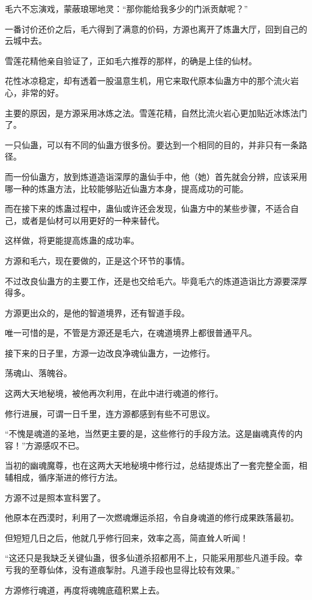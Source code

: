 \begin{this_body}
毛六不忘演戏，蒙蔽琅琊地灵：“那你能给我多少的门派贡献呢？”

一番讨价还价之后，毛六得到了满意的价码，方源也离开了炼蛊大厅，回到自己的云城中去。

雪莲花精他亲自验证了，正如毛六推荐的那样，的确是上佳的仙材。

花性冰凉稳定，却有透着一股温意生机，用它来取代原本仙蛊方中的那个流火岩心，非常的好。

主要的原因，是方源采用冰炼之法。雪莲花精，自然比流火岩心更加贴近冰炼法门了。

一只仙蛊，可以有不同的仙蛊方很多份。要达到一个相同的目的，并非只有一条路径。

而一份仙蛊方，放到炼道造诣深厚的蛊仙手中，他（她）首先就会分辨，应该采用哪一种的炼蛊方法，比较能够贴近仙蛊方本身，提高成功的可能。

而在接下来的炼蛊过程中，蛊仙或许还会发现，仙蛊方中的某些步骤，不适合自己，或者是仙材可以用更好的一种来替代。

这样做，将更能提高炼蛊的成功率。

方源和毛六，现在要做的，正是这个环节的事情。

不过改良仙蛊方的主要工作，还是也交给毛六。毕竟毛六的炼道造诣比方源要深厚得多。

方源更出众的，是他的智道境界，还有智道手段。

唯一可惜的是，不管是方源还是毛六，在魂道境界上都很普通平凡。

接下来的日子里，方源一边改良净魂仙蛊方，一边修行。

荡魂山、落魄谷。

这两大天地秘境，被他再次利用，在此中进行魂道的修行。

修行进展，可谓一日千里，连方源都感到有些不可思议。

“不愧是魂道的圣地，当然更主要的是，这些修行的手段方法。这是幽魂真传的内容！”方源感叹不已。

当初的幽魂魔尊，也在这两大天地秘境中修行过，总结提炼出了一套完整全面，相辅相成，循序渐进的修行方法。

方源不过是照本宣科罢了。

他原本在西漠时，利用了一次燃魂爆运杀招，令自身魂道的修行成果跌落最初。

但短短几日之后，他就几乎修行回来，效率之高，简直耸人听闻！

“这还只是我缺乏关键仙蛊，很多仙道杀招都用不上，只能采用那些凡道手段。幸亏我的至尊仙体，没有道痕掣肘。凡道手段也显得比较有效果。”

方源修行魂道，再度将魂魄底蕴积累上去。


\end{this_body}
